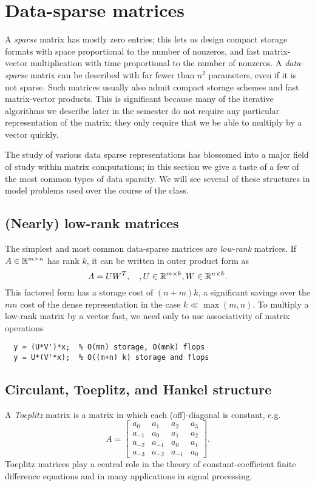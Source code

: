 \documentclass[12pt, leqno]{article} %
\begin{document}
\section{Data-sparse matrices}

A {\em sparse} matrix has mostly zero entries; this lets us design
compact storage formats with space proportional to the number of nonzeros,
and fast matrix-vector multiplication with time proportional to the
number of nonzeros.  A {\em data-sparse} matrix can be described with
far fewer than $n^2$ parameters, even if it is not sparse.  Such matrices
usually also admit compact storage schemes and fast matrix-vector products.
This is significant because many of the iterative algorithms we
describe later in the semester do not require any particular representation
of the matrix; they only require that we be able to multiply by a vector
quickly.

The study of various data sparse representations has blossomed into a
major field of study within matrix computations; in this section we give
a taste of a few of the most common types of data sparsity.  We will
see several of these structures in model problems used over the course
of the class.

\subsection{(Nearly) low-rank matrices}

The simplest and most common data-sparse matrices are {\em low-rank}
matrices.  If $A \in \mathbb{R}^{m \times n}$ has rank $k$, it can be written
in outer product form as
\[
  A = UW^T, \quad, U \in \mathbb{R}^{m \times k}, W \in \mathbb{R}^{n \times k}.
\]
This factored form has a storage cost of $(n+m) k$, a significant savings
over the $mn$ cost of the dense representation in the case $k \ll \max(m,n)$.
To multiply a low-rank matrix by a vector fast, we need only to use
associativity of matrix operations
\begin{lstlisting}
  y = (U*V')*x;  % O(mn) storage, O(mnk) flops
  y = U*(V'*x);  % O((m+n) k) storage and flops
\end{lstlisting}

\subsection{Circulant, Toeplitz, and Hankel structure}

A {\em Toeplitz} matrix is a matrix in which each (off)-diagonal is
constant, e.g.
\[
  A =
  \begin{bmatrix}
    a_0    & a_1    & a_2    & a_3 \\
    a_{-1} & a_0    & a_1    & a_2 \\
    a_{-2} & a_{-1} & a_0    & a_1 \\
    a_{-3} & a_{-2} & a_{-1} & a_0
  \end{bmatrix}.
\]
Toeplitz matrices play a central role in the theory of constant-coefficient
finite difference equations and in many applications in signal processing.
\end{document}
